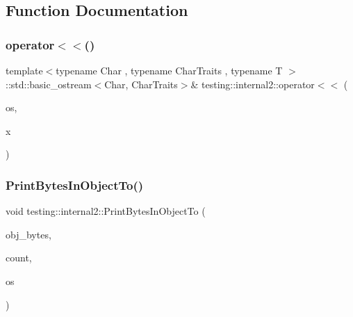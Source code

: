 \subsection{Function Documentation}
\mbox{\label{namespacetesting_1_1internal2_a07dbe129beb8952074f04b599dfce39b}} 
\subsubsection{\texorpdfstring{operator$<$$<$()}{operator<<()}}
{\footnotesize\ttfamily template$<$typename Char , typename Char\+Traits , typename T $>$ \\
\+::std\+::basic\+\_\+ostream$<$Char, Char\+Traits$>$\& testing\+::internal2\+::operator$<$$<$ (\begin{DoxyParamCaption}\item[{\+::std\+::basic\+\_\+ostream$<$ Char, Char\+Traits $>$ \&}]{os,  }\item[{const T \&}]{x }\end{DoxyParamCaption})}

\mbox{\label{namespacetesting_1_1internal2_abfb9aa80365f93b952e9a4bea09947a8}} 
\subsubsection{\texorpdfstring{PrintBytesInObjectTo()}{PrintBytesInObjectTo()}\hspace{0.1cm}{\footnotesize\ttfamily [1/2]}}
{\footnotesize\ttfamily void testing\+::internal2\+::\+Print\+Bytes\+In\+Object\+To (\begin{DoxyParamCaption}\item[{const unsigned char $\ast$}]{obj\+\_\+bytes,  }\item[{size\+\_\+t}]{count,  }\item[{ostream $\ast$}]{os }\end{DoxyParamCaption})}

\mbox{\label{namespacetesting_1_1internal2_a9fbf8e07c0f94dc74d6ef5e56cd3c553}} 
